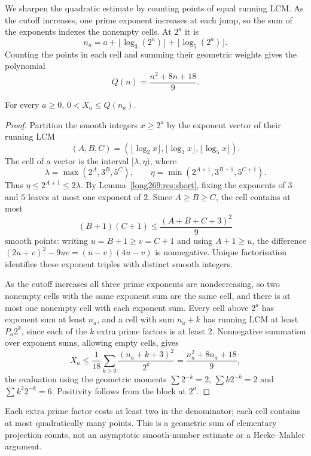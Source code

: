\documentclass[11pt]{article}
\theoremstyle{remark}
\theoremstyle{plain}
\newcommand{\lo}{\lambda}
\newcommand{\hi}{\eta}
\begin{document}
We sharpen the quadratic estimate by counting points of equal running LCM.
As the cutoff increases, one prime exponent increases at each jump, so
the sum of the exponents indexes the nonempty cells. At $2^a$ it is
\[
 n_a=a+\lfloor\log_3(2^a)\rfloor+\lfloor\log_5(2^a)\rfloor.
\]
Counting the points in each cell and summing their geometric weights
gives the polynomial
\[
 Q(n)=\frac{n^2+8n+18}{9}.
\]

\begin{theorem}\label{long269:res:actual-tail-bound}
For every $a\ge0$, $0<X_a\le Q(n_a)$.
\end{theorem}

\begin{proof}
Partition the smooth integers $x\ge2^{a}$ by the exponent vector of their running LCM
\[
 (A,B,C)=(\lfloor\log_2x\rfloor,\lfloor\log_3x\rfloor,\lfloor\log_5x\rfloor).
\]
The cell of a vector is the interval $[\lo,\hi)$, where
\[
 \lo=\max(2^{A},3^{B},5^{C}),\qquad
 \hi=\min(2^{A+1},3^{B+1},5^{C+1}).
\]
Thus $\hi\le2^{A+1}\le2\lo$.  By Lemma~\ref{long269:res:short}, fixing the
exponents of $3$ and $5$ leaves at most one exponent of $2$.  Since $A\ge B\ge C$, the cell
contains at most
\[
 (B+1)(C+1)\le\frac{(A+B+C+3)^{2}}{9}
\]
smooth points: writing $u=B+1\ge v=C+1$ and using $A+1\ge u$, the difference
$(2u+v)^{2}-9uv=(u-v)(4u-v)$ is nonnegative.  Unique factorisation identifies
these exponent triples with distinct smooth integers.

As the cutoff increases all three prime exponents are nondecreasing, so two
nonempty cells with the same exponent sum are the same cell, and there is at most one nonempty cell with each exponent sum.  Every cell above
$2^a$ has exponent sum at least $n_a$, and a cell with sum $n_a+k$ has
running LCM at least $P_a2^k$,
since each of the $k$ extra prime factors is at least $2$.  Nonnegative summation over exponent sums, allowing empty cells, gives
\[
 X_a\le\frac1{18}\sum_{k\ge0}\frac{(n_a+k+3)^{2}}{2^{k}}
      =\frac{n_a^{2}+8n_a+18}{9},
\]
the evaluation using the geometric moments $\sum2^{-k}=2$, $\sum k2^{-k}=2$
and $\sum k^{2}2^{-k}=6$.  Positivity follows from the block at $2^{a}$.
\end{proof}

Each extra prime factor costs at least two in the denominator; each
cell contains at most quadratically many points. This is a geometric
sum of elementary projection counts, not an asymptotic smooth-number
estimate or a Hecke--Mahler argument.
\end{document}

